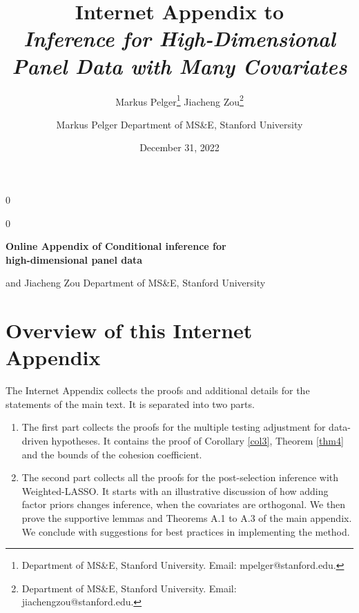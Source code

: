 \documentclass[11pt]{article}
\newcommand{\blind}{0}
\begin{document}
	
	
	\def\spacingset#1{\renewcommand{\baselinestretch}%
		{#1}\small\normalsize} \spacingset{1}
	
	
	
	\blind
	{
		\title{\bf Internet Appendix to \\ \textit{Inference for High-Dimensional Panel Data with Many Covariates}}
		\author{Markus Pelger\thanks{Department of MS\&E, Stanford University. Email: mpelger@stanford.edu. }\hspace{.6cm}
			Jiacheng Zou\thanks{Department of MS\&E, Stanford University. Email: jiachengzou@stanford.edu. }\\
		}
		\date{December 31, 2022}
		\maketitle
	} \fi
	
	\blind
	{
		\bigskip
		\bigskip
		\bigskip
		\begin{center}
			{\LARGE\bf Online Appendix of Conditional inference for\\high-dimensional panel data}
		\end{center}
		\author{Markus Pelger\hspace{.2cm}
			Department of MS\&E, Stanford University}
		and 
		{Jiacheng Zou\hspace{.2cm}
			Department of MS\&E, Stanford University}
		\maketitle
		\medskip
	} \fi
	
	\tableofcontents
	
	\newpage
	
	
	\section*{Overview of this Internet Appendix}
	
	
	The Internet Appendix collects the proofs and additional details for the statements of the main text. It is separated into two parts. 
	\begin{enumerate}
		\item The first part collects the proofs for the multiple testing adjustment for data-driven hypotheses. It contains the proof of Corollary \ref{col3}, Theorem \ref{thm4} and the bounds of the cohesion coefficient.
		\item The second part collects all the proofs for the post-selection inference with Weighted-LASSO. It starts with an illustrative discussion of how adding factor priors changes inference, when the covariates are orthogonal. We then prove the supportive lemmas and Theorems A.1 to A.3 of the main appendix. We conclude with suggestions for best practices in implementing the method.
	\end{enumerate}
	
\end{document}
